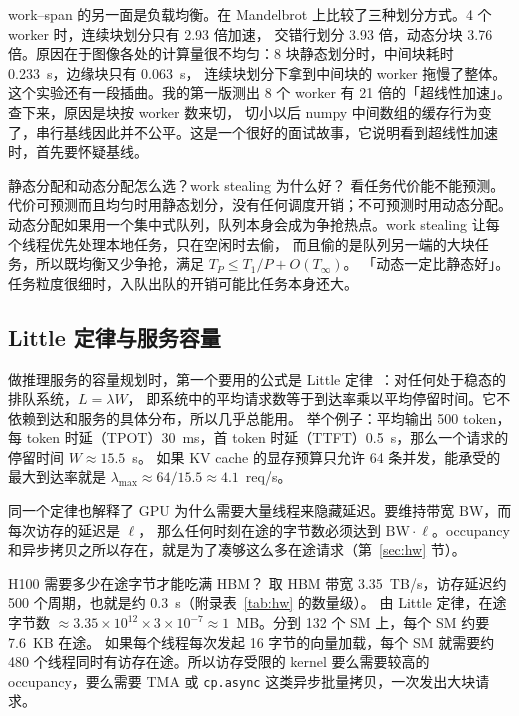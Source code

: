 work--span 的另一面是负载均衡。在 Mandelbrot 上比较了三种划分方式。4 个 worker 时，连续块划分只有 2.93 倍加速，
交错行划分 3.93 倍，动态分块 3.76 倍。原因在于图像各处的计算量很不均匀：8 块静态划分时，中间块耗时 0.233~s，边缘块只有 0.063~s，
连续块划分下拿到中间块的 worker 拖慢了整体。
这个实验还有一段插曲。我的第一版测出 8 个 worker 有 21 倍的「超线性加速」。查下来，原因是块按 worker 数来切，
切小以后 numpy 中间数组的缓存行为变了，串行基线因此并不公平。这是一个很好的面试故事，它说明看到超线性加速时，首先要怀疑基线。

\begin{qa}{静态分配和动态分配怎么选？work stealing 为什么好？}
\ans 看任务代价能不能预测。代价可预测而且均匀时用静态划分，没有任何调度开销；不可预测时用动态分配。
动态分配如果用一个集中式队列，队列本身会成为争抢热点。work stealing 让每个线程优先处理本地任务，只在空闲时去偷，
而且偷的是队列另一端的大块任务，所以既均衡又少争抢，满足 $T_P\le T_1/P+O(T_\infty)$。
\wrong 「动态一定比静态好」。任务粒度很细时，入队出队的开销可能比任务本身还大。
\end{qa}

\subsection{Little 定律与服务容量}

做推理服务的容量规划时，第一个要用的公式是 Little 定律~\cite{little1961proof}：对任何处于稳态的排队系统，$L=\lambda W$，
即系统中的平均请求数等于到达率乘以平均停留时间。它不依赖到达和服务的具体分布，所以几乎总能用。
举个例子：平均输出 500 token，每 token 时延（TPOT）30~ms，首 token 时延（TTFT）0.5~s，那么一个请求的停留时间 $W\approx 15.5$~s。
如果 KV cache 的显存预算只允许 64 条并发，能承受的最大到达率就是 $\lambda_{\max}\approx 64/15.5\approx 4.1$~req/s。

同一个定律也解释了 GPU 为什么需要大量线程来隐藏延迟。要维持带宽 $\mathrm{BW}$，而每次访存的延迟是 $\ell$，
那么任何时刻在途的字节数必须达到 $\mathrm{BW}\cdot\ell$。occupancy 和异步拷贝之所以存在，就是为了凑够这么多在途请求（第~\ref{sec:hw} 节）。

\begin{est}{H100 需要多少在途字节才能吃满 HBM？}
取 HBM 带宽 3.35~TB/s，访存延迟约 500 个周期，也就是约 0.3~\textmu s（附录表~\ref{tab:hw} 的数量级）。
由 Little 定律，在途字节数 $\approx 3.35\times10^{12}\times 3\times10^{-7}\approx 1$~MB。分到 132 个 SM 上，每个 SM 约要 7.6~KB 在途。
如果每个线程每次发起 16 字节的向量加载，每个 SM 就需要约 480 个线程同时有访存在途。所以访存受限的 kernel
要么需要较高的 occupancy，要么需要 TMA 或 \texttt{cp.async} 这类异步批量拷贝，一次发出大块请求。
\end{est}

